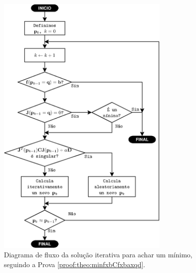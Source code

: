 \begin{figure}[!h]
     \centering
         \includegraphics[width=0.75\textwidth]{chapters/minimization-fx/fluxo2.eps}
        \caption{Diagrama de fluxo da solução iterativa para achar um mínimo, seguindo a Prova \ref{proof:theo:minfxbCfxbaxqd}.}
        \label{fig:fluxo2}
\end{figure}

